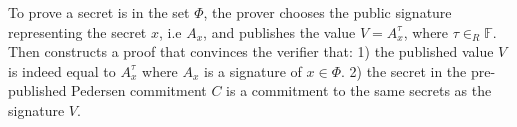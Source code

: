 To prove a secret is in the set $\Phi$, the prover chooses the public signature  representing the secret $x$, i.e $A_x$, and publishes the value $V = A_x^\tau$, where $\tau\in_R\mathds{F}$.
Then constructs a proof that convinces the verifier that:  1) the published value $V$ is indeed equal to  $A_x^\tau$ where $A_x$ is a signature of $x\in\Phi$.  2) the secret in the pre-published Pedersen commitment $C$ is a commitment to the same secrets as the signature $V$.

